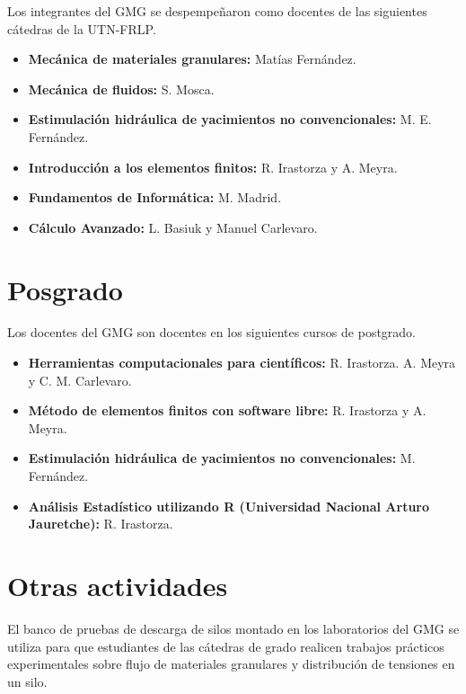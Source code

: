 \documentclass[a4paper,11pt,twoside,final,titlepage,onecolumn,openright]{report}
\begin{document}
Los integrantes del GMG se despempeñaron como docentes de las siguientes cátedras de la UTN-FRLP.

\begin{itemize}
 \item {\bf Mecánica de materiales granulares:} Matías Fernández.
 \item {\bf Mecánica de fluidos:} S. Mosca.
 \item {\bf Estimulación hidráulica de yacimientos no convencionales:} M. E. Fernández.
 \item {\bf Introducción a los elementos finitos:} R. Irastorza y A. Meyra.
 \item {\bf Fundamentos de Informática:} M. Madrid.
 \item {\bf Cálculo Avanzado:} L. Basiuk y Manuel Carlevaro.
\end{itemize}




\section{Posgrado}

Los docentes del GMG son docentes en los siguientes cursos de postgrado.

\begin{itemize}
 \item {\bf Herramientas computacionales para científicos:} R. Irastorza. A. Meyra y C. M. Carlevaro.
 \item \textbf{Método de elementos finitos con software libre:} R. Irastorza y A. Meyra.
 \item \textbf{Estimulación hidráulica de yacimientos no convencionales:} M. Fernández.
 \item {\bf Análisis Estadístico utilizando R (Universidad Nacional Arturo Jauretche):} R. Irastorza.
\end{itemize}

\section{Otras actividades}

El banco de pruebas de descarga de silos montado en los laboratorios del GMG se utiliza para que estudiantes de las cátedras de grado realicen trabajos prácticos experimentales sobre flujo de materiales granulares y distribución de tensiones en un silo. 
\end{document}
